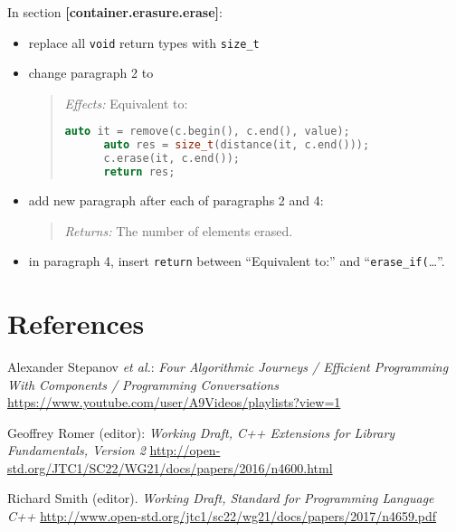 \documentclass[11pt]{article}
\begin{document}
In section \textbf{[container.erasure.erase]}:

\begin{itemize}
\item replace all \texttt{void} return types with \texttt{size\_t}
\item change paragraph 2 to
  \begin{quotation}
    \textit{Effects:} Equivalent to:
    \begin{lstlisting}[language=C++]
      auto it = remove(c.begin(), c.end(), value);
      auto res = size_t(distance(it, c.end()));
      c.erase(it, c.end());
      return res;
    \end{lstlisting}
  \end{quotation}
\item add new paragraph after each of paragraphs 2 and 4:
  \begin{quotation}
    \textit{Returns:} The number of elements erased.
  \end{quotation}
\item in paragraph 4, insert \texttt{return} between ``Equivalent to:'' and ``\texttt{erase\_if(}\ldots''.
\end{itemize}

\section{References}
\renewcommand{\section}[2]{}%
\begin{thebibliography}{9}

    Alexander Stepanov \emph{et al.}:
    \emph{Four Algorithmic Journeys / Efficient Programming With Components / Programming Conversations}\newline
    \url{https://www.youtube.com/user/A9Videos/playlists?view=1}

   Geoffrey Romer (editor): \emph{Working
      Draft, C++ Extensions for Library Fundamentals, Version
      2}\newline
    \url{http://open-std.org/JTC1/SC22/WG21/docs/papers/2016/n4600.html}

   Richard Smith (editor). \emph{Working Draft,
      Standard for Programming Language C++}\newline
    \url{http://www.open-std.org/jtc1/sc22/wg21/docs/papers/2017/n4659.pdf}

\end{thebibliography}
\end{document}
